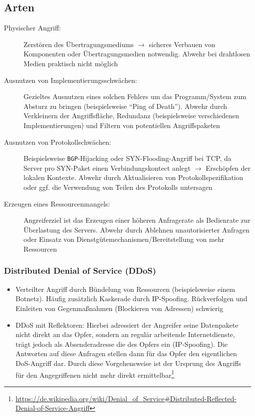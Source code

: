 \subsection{Arten}
\begin{description}
	\item[Physischer Angriff:] Zerstören des Übertragungsmediums \(\rightarrow\) sicheres Verbauen von Komponenten oder Übertragungsmedien notwendig. Abwehr bei drahtlosen Medien praktisch nicht möglich
	\item[Ausnutzen von Implementierungsschwächen:] Gezieltes Ausnutzen eines solchen Fehlers um das Programm/System zum Absturz zu bringen (beispielsweise "`Ping of Death"'). Abwehr durch Verkleinern der Angriffsfläche, Redundanz (beispielsweise verschiedenen Implementierungen) und Filtern von potentiellen Angriffspaketen
	\item[Ausnutzen von Protokollschwächen:] Beispielsweise \texttt{BGP}-Hijacking oder SYN-Flooding-Angriff bei TCP, da Server pro SYN-Paket einen Verbindungskontect anlegt \(\rightarrow\) Erschöpfen der lokalen Kontexte. Abwehr durch Aktualisieren von Protokollspezifikation oder ggf. die Verwendung von Teilen des Protokolls untersagen
	\item[Erzeugen eines Ressourcenmangels:] Angreiferziel ist das Erzeugen einer höheren Anfragerate als Bedienrate zur Überlastung des Servers. Abwehr durch Ablehnen unautorisierter Anfragen oder Einsatz von Dienstgütemechanismen/Bereitstellung von mehr Ressourcen
\end{description}

\subsubsection{Distributed Denial of Service (DDoS)}
\begin{itemize}
	\item Verteilter Angriff durch Bündelung von Ressourcen (beispielsweise einem Botnetz). Häufig zusätzlich Kaskerade durch IP-Spoofing. Rückverfolgen und Einleiten von Gegenmaßnahmen (Blockieren von Adressen) schwierig
	\item DDoS mit Reflektoren: Hierbei adressiert der Angreifer seine Datenpakete nicht direkt an das Opfer, sondern an regulär arbeitende Internetdienste, trägt jedoch als Absenderadresse die des Opfers ein (IP-Spoofing). Die Antworten auf diese Anfragen stellen dann für das Opfer den eigentlichen DoS-Angriff dar. Durch diese Vorgehensweise ist der Ursprung des Angriffs für den Angegriffenen nicht mehr direkt ermittelbar\footnote{\url{https://de.wikipedia.org/wiki/Denial_of_Service\#Distributed-Reflected-Denial-of-Service-Angriff}}
\end{itemize}


